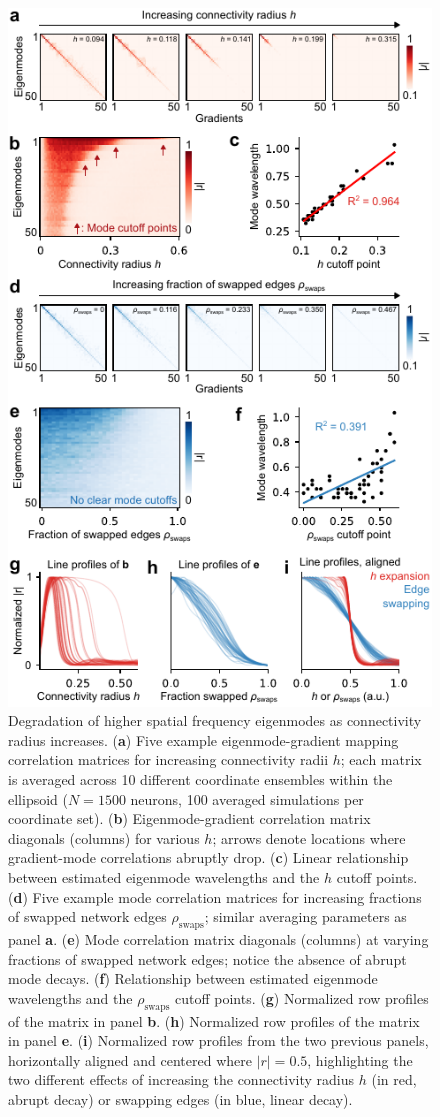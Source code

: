 \documentclass{article}
\begin{document}
\begin{figure}[t]
    \centering
    \includegraphics[width=0.5\linewidth]{figures/figure3.pdf}
    \caption{Degradation of higher spatial frequency eigenmodes as connectivity radius increases. (\textbf{a}) Five example eigenmode-gradient mapping correlation matrices for increasing connectivity radii $h$; each matrix is averaged across 10 different coordinate ensembles within the ellipsoid ($N=1500$ neurons, 100 averaged simulations per coordinate set). (\textbf{b}) Eigenmode-gradient correlation matrix diagonals (columns) for various $h$; arrows denote locations where gradient-mode correlations abruptly drop. (\textbf{c}) Linear relationship between estimated eigenmode wavelengths and the $h$ cutoff points. (\textbf{d}) Five example mode correlation matrices for increasing fractions of swapped network edges $\rho_{\text{swaps}}$; similar averaging parameters as panel \textbf{a}. (\textbf{e}) Mode correlation matrix diagonals (columns) at varying fractions of swapped network edges; notice the absence of abrupt mode decays. (\textbf{f}) Relationship between estimated eigenmode wavelengths and the $\rho_{\text{swaps}}$ cutoff points. (\textbf{g}) Normalized row profiles of the matrix in panel \textbf{b}. (\textbf{h}) Normalized row profiles of the matrix in panel \textbf{e}. (\textbf{i}) Normalized row profiles from the two previous panels, horizontally aligned and centered where $|r|=0.5$, highlighting the two different effects of increasing the connectivity radius $h$ (in red, abrupt decay) or swapping edges (in blue, linear decay).}
    \label{fig3}
    \hrulefill
\end{figure}
\end{document}
